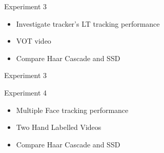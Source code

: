\documentclass[mathserif, 14pt, xcolor=svgnames]{beamer}
\begin{document}
\bgroup
\begin{frame}{Experiment 3}
    \begin{itemize}
       \setlength\itemsep{1.2em}
       \item \hspace{0pt}
         \pause Investigate tracker's LT tracking performance
       \item \hspace{0pt}
         \pause VOT video
       \item \hspace{0pt}
         \pause Compare Haar Cascade and SSD
    \end{itemize}
\end{frame}
\egroup


\bgroup
\begin{frame}{Experiment 3}
  \begin{table}
        \caption{Performance Metrics for LT Sequence}
  \end{table}
\end{frame}
\egroup

\bgroup
\begin{frame}{Experiment 4}
    \begin{itemize}
      \setlength\itemsep{1.2em}
       \item \hspace{0pt}
         \pause Multiple Face tracking performance
       \item \hspace{0pt}
         \pause Two Hand Labelled Videos
       \item \hspace{0pt}
         \pause Compare Haar Cascade and SSD
    \end{itemize}
\end{frame}
\egroup
\end{document}
